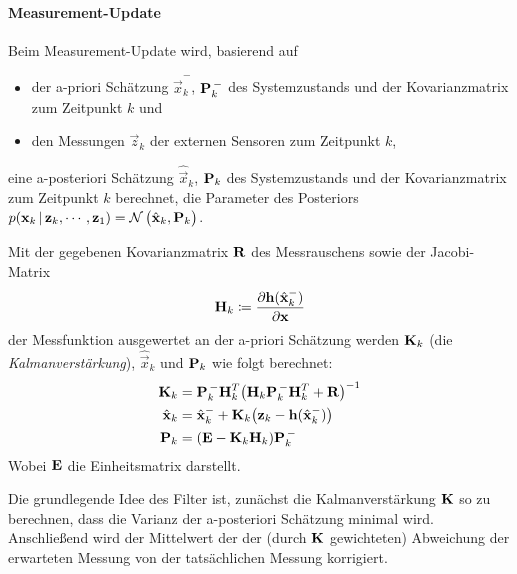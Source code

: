 				\paragraph{Measurement-Update} %
					Beim Measurement-Update wird, basierend auf
					\begin{itemize}
						\item der a-priori Schätzung \( \hat{\vec{x}}_k^- \), \( \boldsymbol{\mathrm{P}}_k^{\,-} \) des Systemzustands und der Kovarianzmatrix zum Zeitpunkt \(k\) und
						\item den Messungen \( \vec{z}_k \) der externen Sensoren zum Zeitpunkt \(k\),
					\end{itemize}
					eine a-posteriori Schätzung \( \hat{\vec{x}}_k \), \( \boldsymbol{\mathrm{P}}_k \) des Systemzustands und der Kovarianzmatrix zum Zeitpunkt \(k\) berechnet, \dh die Parameter des Posteriors \( p(\boldsymbol{\mathrm{x}}_k \,\vert\, \boldsymbol{\mathrm{z}}_k, \cdots, \boldsymbol{\mathrm{z}}_1) = \mathcal{N}\,\big(\hat{\boldsymbol{\mathrm{x}}}_k, \boldsymbol{\mathrm{P}}_k\big) \).
					
					Mit der gegebenen Kovarianzmatrix \( \boldsymbol{\mathrm{R}} \) des Messrauschens sowie der Jacobi-Matrix
					\begin{equation*}
						\boldsymbol{\mathrm{H}}_k \coloneqq \frac{\partial \boldsymbol{\mathrm{h}}(\hat{\boldsymbol{\mathrm{x}}}_k^-)}{\partial \boldsymbol{\mathrm{x}}}
					\end{equation*}
					der Messfunktion ausgewertet an der a-priori Schätzung werden \( \boldsymbol{\mathrm{K}}_k \) (die \emph{Kalmanverstärkung}), \( \hat{\vec{x}}_k \) und \( \boldsymbol{\mathrm{P}}_k \) wie folgt berechnet:
					\begin{align*}
						\boldsymbol{\mathrm{K}}_k &= \boldsymbol{\mathrm{P}}_k^{\,-} \boldsymbol{\mathrm{H}}_k^T \big( \boldsymbol{\mathrm{H}}_k \boldsymbol{\mathrm{P}}_k^{\,-} \boldsymbol{\mathrm{H}}_k^T + \boldsymbol{\mathrm{R}} \big)^{-1} \\
						\hat{\boldsymbol{\mathrm{x}}}_k &= \hat{\boldsymbol{\mathrm{x}}}_k^- + \boldsymbol{\mathrm{K}}_k \big( \boldsymbol{\mathrm{z}}_k - \boldsymbol{\mathrm{h}}(\hat{\boldsymbol{\mathrm{x}}}_k^-) \big) \\
						\boldsymbol{\mathrm{P}}_k &= (\boldsymbol{\mathrm{E}} - \boldsymbol{\mathrm{K}}_k \boldsymbol{\mathrm{H}}_k) \boldsymbol{\mathrm{P}}_k^{\,-}
					\end{align*}
					Wobei \( \boldsymbol{\mathrm{E}} \) die Einheitsmatrix darstellt.
					
					Die grundlegende Idee des Filter ist, zunächst die Kalmanverstärkung \( \boldsymbol{\mathrm{K}} \) so zu berechnen, dass die Varianz der a-posteriori Schätzung minimal wird. Anschließend wird der Mittelwert der der (durch \( \boldsymbol{\mathrm{K}} \) gewichteten) Abweichung der erwarteten Messung von der tatsächlichen Messung korrigiert.
					
